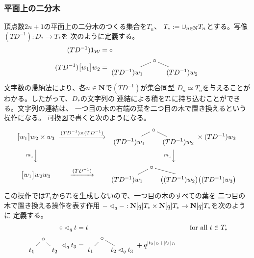 {\subsubsection{平面上の二分木}\label{s3:平面上の二分木} %
	頂点数$2n+1$の平面上の二分木のつくる集合を$T_n$、
	$T_*:=\cup_{n\in\mathbf{N}}T_n$とする。写像$(TD^{-1}):D_*\to T_*$を
	次のように定義する。
	\begin{equation*}\begin{split}
		(TD^{-1}) 1_\W &= \circ \\
		(TD^{-1}) \gdyck{w_1}w_2 &= \vcenter{\xymatrix@R=1ex@C=2ex{
			& \circ \ar@{-}[dl] \ar@{-}[dr] \\
			(TD^{-1})w_1 & & (TD^{-1})w_2
		}}
	\end{split}\end{equation*}
	文字数の帰納法により、各$n\in\mathbf{N}$で$(TD^{-1})$が集合同型
	$D_n\simeq T_n$を与えることがわかる。したがって、$D_*$の文字列の
	連結による積を$T_*$に持ち込むことができる。文字列の連結は、
	一つ目の木の右端の葉を二つ目の木で置き換えるという操作になる。
	可換図で書くと次のようになる。
	\begin{equation*}\begin{CD}
		\gdyck{w_1}w_2\times w_3 @> {(TD^{-1})\times(TD^{-1})} >>
		\vcenter{\xymatrix@R=1ex@C=1ex{
			& \circ \ar@{-}[dl] \ar@{-}[dr] \\
			(TD^{-1})w_1 & & (TD^{-1})w_2
		}}\times (TD^{-1})w_3 \\
		@V m_\myspace VV @V m_\myspace VV \\
		\gdyck{w_1}w_2w_3 @> {(TD^{-1})} >>
		\vcenter{\xymatrix@R=1ex@C=1ex{
			& \circ \ar@{-}[dl] \ar@{-}[dr] \\
			(TD^{-1})w_1 & & \glr{(TD^{-1})w_2}\glr{(TD^{-1})w_3}
		}} \\
	\end{CD}\end{equation*}
	この操作では$T_1$から$T_*$を生成しないので、一つ目の木のすべての葉を
	二つ目の木で置き換える操作を表す作用
	$-\lhd_q-:\mathbf{N}[q]T_*\times \mathbf{N}[q]T_*\to \mathbf{N}[q]T_*$を次のように
	定義する。
	\begin{alignat*}{2}
		\circ\lhd_q t &= t && \quad\text{for all } t\in T_* \\
		\vcenter{\xymatrix@R=1ex@C=1ex{
			& \circ \ar@{-}[dl] \ar@{-}[dr] \\
			t_1 & & t_2
		}} \lhd_q t_3 &= \vcenter{\xymatrix@R=1ex@C=1ex{
			& \circ \ar@{-}[dl] \ar@{-}[dr] \\
			t_1 & & t_2\lhd_q t_3
		}} + q^{|t_2|_D + |t_3|_D} \vcenter{\xymatrix@R=1ex@C=1ex{
}}
\end{alignat*}}
